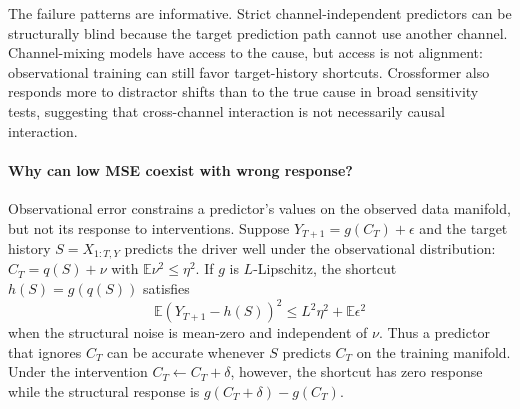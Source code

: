 \documentclass{article}
\begin{document}
\begin{table}[t]
\centering
\caption{Sanity checks for the response evaluation. ARX confirms that the same
preprocessing and evaluation pipeline can recover the correct response. Small-delta
tests use $\delta\in\{\pm0.1,\pm0.25,\pm0.5,\pm1\}$ and show that near-zero
response is not merely a large-shift artifact.}
\label{tab:main_sanity}
\end{table}

The failure patterns are informative. Strict channel-independent predictors can be
structurally blind because the target prediction path cannot use another channel.
Channel-mixing models have access to the cause, but access is not alignment:
observational training can still favor target-history shortcuts. Crossformer also
responds more to distractor shifts than to the true cause in broad sensitivity
tests, suggesting that cross-channel interaction is not necessarily causal
interaction.

\paragraph{Why can low MSE coexist with wrong response?}

Observational error constrains a predictor's values on the observed data manifold,
but not its response to interventions. Suppose
$Y_{T+1}=g(C_T)+\epsilon$ and the target history $S=X_{1:T,Y}$ predicts the driver
well under the observational distribution: $C_T=q(S)+\nu$ with
$\mathbb{E}\nu^2\leq\eta^2$. If $g$ is $L$-Lipschitz, the shortcut
$h(S)=g(q(S))$ satisfies
\begin{equation}
\mathbb{E}\left(Y_{T+1}-h(S)\right)^2
\leq L^2\eta^2+\mathbb{E}\epsilon^2
\end{equation}
when the structural noise is mean-zero and independent of $\nu$. Thus a predictor
that ignores $C_T$ can be accurate whenever $S$ predicts $C_T$ on the training
manifold. Under the intervention $C_T\leftarrow C_T+\delta$, however, the shortcut
has zero response while the structural response is $g(C_T+\delta)-g(C_T)$.
\end{document}
